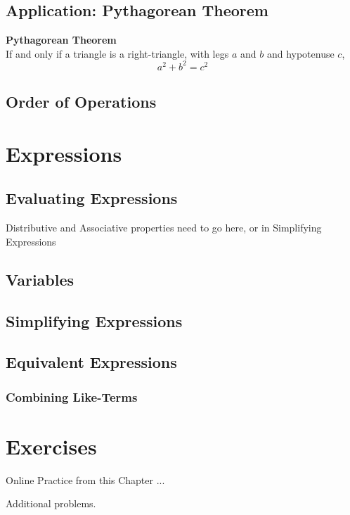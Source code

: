 \newpage 
\subsection{Application: Pythagorean Theorem} 

\begin{theorem} \textbf{Pythagorean Theorem} \\ 
If and only if a triangle is a right-triangle, with legs \(a\) and \(b\) and hypotenuse \(c\),
\[a^2 + b^2 = c^2\]
\end{theorem}


\newpage 
\subsection{Order of Operations}


\newpage 
\section{Expressions}

\subsection{Evaluating Expressions}
Distributive and Associative properties need to go here, or in Simplifying Expressions
\subsection{Variables}
\subsection{Simplifying Expressions}
\subsection{Equivalent Expressions}
\subsubsection{Combining Like-Terms}

\newpage 
\section{Exercises} 

Online Practice from this Chapter ... 

Additional problems. 















